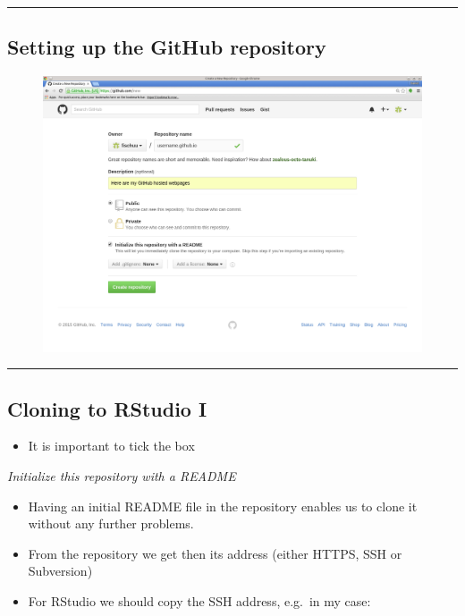 \begin{center}\rule{0.5\linewidth}{\linethickness}\end{center}

\subsection{Setting up the GitHub
repository}\label{setting-up-the-github-repository}

\begin{figure}[htbp]
\centering
\includegraphics{assets/img/GitHub1.png}
\caption{}
\end{figure}

\begin{center}\rule{0.5\linewidth}{\linethickness}\end{center}

\subsection{Cloning to RStudio I}\label{cloning-to-rstudio-i}

\begin{itemize}
\tightlist
\item
  It is important to tick the box
\end{itemize}

\emph{Initialize this repository with a README}

\begin{itemize}
\item
  Having an initial README file in the repository enables us to clone it
  without any further problems.
\item
  From the repository we get then its address (either HTTPS, SSH or
  Subversion)
\item
  For RStudio we should copy the SSH address, e.g.~in my case:
\end{itemize}

